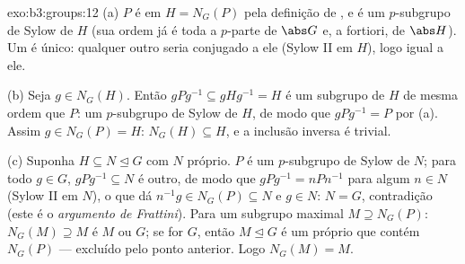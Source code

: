 \begin{solution}{exo:b3:groups:12}
(a) $P$ é  em $H = N_G(P)$ pela definição de , e é um
$p$-subgrupo de Sylow de $H$ (sua ordem já é toda a
$p$-parte de $\abs G$ e, a fortiori, de $\abs H$). Um   é único: qualquer outro seria conjugado a ele (Sylow II
em $H$), logo igual a ele.

(b) Seja $g \in N_G(H)$. Então $gPg^{-1} \subseteq gHg^{-1} = H$ é um subgrupo de $H$ de mesma ordem que
$P$: um $p$-subgrupo de Sylow de $H$, de modo que $gPg^{-1} = P$ por
(a). Assim $g \in
N_G(P) = H$: $N_G(H) \subseteq H$, e a inclusão inversa é trivial.

(c) Suponha $H \subseteq N \trianglelefteq G$ com $N$ próprio. $P$ é um $p$-subgrupo de
Sylow de $N$; para todo $g \in G$, $gPg^{-1} \subseteq N$ é outro, de modo que $gPg^{-1} = nPn^{-1}$ para
algum $n \in N$ (Sylow II em $N$), o que dá $n^{-1}g \in N_G(P)
\subseteq N$ e $g \in N$: $N = G$,
contradição (este é o \emph{argumento de Frattini}). Para um subgrupo
maximal $M \supseteq
N_G(P)$: $N_G(M) \supseteq M$ é $M$ ou $G$; se for $G$, então $M \trianglelefteq G$ é
um  próprio que contém $N_G(P)$ --- excluído pelo
ponto anterior. Logo $N_G(M) = M$.
\end{solution}

